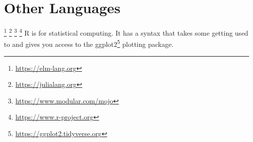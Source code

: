 \section{Other Languages}

\begin{itemize}
  \footnote{\url{https://elm-lang.org}}
  \footnote{\url{https://julialang.org}}
  \footnote{\url{https://www.modular.com/mojo}}
  \footnote{\url{https://www.r-project.org}} R is for statistical computing. It has a syntax that takes some getting used to and gives you access to the ggplot2\footnote{\url{https://ggplot2.tidyverse.org}} plotting package.
\end{itemize}
